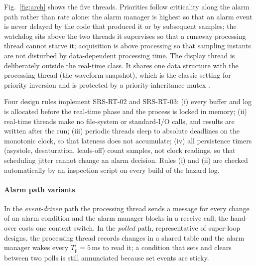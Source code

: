 \documentclass[preprint,3p,10pt]{elsarticle}
\begin{document}
Fig.~\ref{fig:arch} shows the five threads. Priorities follow criticality along the alarm path rather than rate alone: the alarm manager is highest so that an alarm event is never delayed by the code that produced it or by subsequent samples; the watchdog sits above the two threads it supervises so that a runaway processing thread cannot starve it; acquisition is above processing so that sampling instants are not disturbed by data-dependent processing time. The display thread is deliberately outside the real-time class. It shares one data structure with the processing thread (the waveform snapshot), which is the classic setting for priority inversion and is protected by a priority-inheritance mutex \cite{sha1990}.

Four design rules implement SRS-RT-02 and SRS-RT-03: (i) every buffer and log is allocated before the real-time phase and the process is locked in memory; (ii) real-time threads make no file-system or standard-I/O calls, and results are written after the run; (iii) periodic threads sleep to absolute deadlines on the monotonic clock, so that lateness does not accumulate; (iv) all persistence timers (asystole, desaturation, leads-off) count samples, not clock readings, so that scheduling jitter cannot change an alarm decision. Rules (i) and (ii) are checked automatically by an inspection script on every build of the hazard log.

\paragraph{Alarm path variants} In the \emph{event-driven} path the processing thread sends a message for every change of an alarm condition and the alarm manager blocks in a receive call; the hand-over costs one context switch. In the \emph{polled} path, representative of super-loop designs, the processing thread records changes in a shared table and the alarm manager wakes every $T_{\mathrm p}=5$\,ms to read it; a condition that sets and clears between two polls is still annunciated because set events are sticky.
\end{document}
